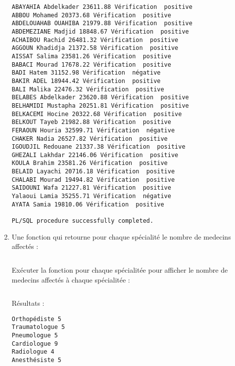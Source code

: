 \documentclass[12pt,a4paper]{article}
\begin{document}
\begin{enumerate}
\begin{snugshade}
\begin{verbatim}
ABAYAHIA Abdelkader 23611.88 Vérification  positive
ABBOU Mohamed 20373.68 Vérification  positive
ABDELOUAHAB OUAHIBA 21979.88 Vérification  positive
ABDEMEZIANE Madjid 18848.67 Vérification  positive
ACHAIBOU Rachid 26481.32 Vérification  positive
AGGOUN Khadidja 21372.58 Vérification  positive
AISSAT Salima 23581.26 Vérification  positive
BABACI Mourad 17678.22 Vérification  positive
BADI Hatem 31152.98 Vérification  négative
BAKIR ADEL 18944.42 Vérification  positive
BALI Malika 22476.32 Vérification  positive
BELABES Abdelkader 23620.88 Vérification  positive
BELHAMIDI Mustapha 20251.81 Vérification  positive
BELKACEMI Hocine 20322.68 Vérification  positive
BELKOUT Tayeb 21982.88 Vérification  positive
FERAOUN Houria 32599.71 Vérification  négative
CHAKER Nadia 26527.82 Vérification  positive
IGOUDJIL Redouane 21337.38 Vérification  positive
GHEZALI Lakhdar 22146.06 Vérification  positive
KOULA Brahim 23581.26 Vérification  positive
BELAID Layachi 20716.18 Vérification  positive
CHALABI Mourad 19494.82 Vérification  positive
SAIDOUNI Wafa 21227.81 Vérification  positive
Yalaoui Lamia 35255.71 Vérification  négative
AYATA Samia 19810.06 Vérification  positive

PL/SQL procedure successfully completed.
        \end{verbatim}
    \end{snugshade}
    \item Une fonction qui retourne pour chaque spécialité le nombre de medecins affectés :
    \begin{snugshade}
        \inputminted[firstline=53, lastline=59]{SQL}{../Scripts/TP4.sql}
    \end{snugshade}
    Exécuter la fonction pour chaque spécialitée pour afficher le nombre de medecins affectés à chaque spécialitée :
    \begin{snugshade}
        \inputminted[firstline=61, lastline=68]{SQL}{../Scripts/TP4.sql}
    \end{snugshade}
    Résultats :
    \begin{snugshade}
        \begin{verbatim}
Orthopédiste 5
Traumatologue 5
Pneumologue 5
Cardiologue 9
Radiologue 4
Anesthésiste 5


\end{verbatim}
\end{snugshade}
\end{enumerate}
\end{document}
